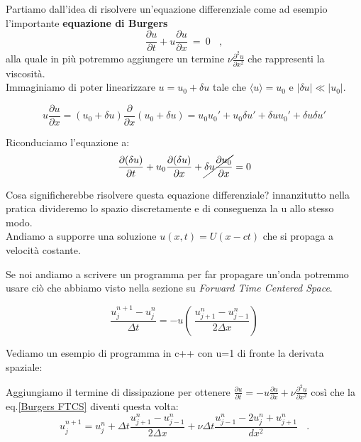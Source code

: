 Partiamo dall'idea di risolvere un'equazione differenziale come ad esempio l'importante \textbf{equazione di Burgers}
\[\frac{\partial u}{\partial t} + u\frac{\partial u}{\partial x}\ =\ 0\ \ \ \ ,\]
alla quale in più potremmo aggiungere un termine $\nu \displaystyle \frac{\partial^2 u}{\partial x^2}$ che rappresenti la viscosità.\\
Immaginiamo di poter linearizzare $u=u_0+\delta u$ tale che $\langle u \rangle=u_0$ e $|\delta u|\ll |u_0|$.

\[u\frac{\partial u}{\partial x} = (u_0+\delta u) \frac{\partial}{\partial x} (u_0+\delta u)=u_0 u_0' + u_0\delta u' + \delta u u_0' + \delta u \delta u'\]

Riconduciamo l'equazione a:
\[ \frac{\partial (\delta u)}{\partial t} + u_0\frac{\partial (\delta u)}{\partial x} + \cancel{\delta u\frac{\partial  u_0}{\partial x}}= 0\]

Cosa significherebbe risolvere questa equazione differenziale? innanzitutto nella pratica divideremo lo spazio discretamente e di conseguenza la u allo stesso modo.\\
Andiamo a supporre una soluzione $u(x, t) = U(x-ct)$ che si propaga a velocità costante.

Se noi andiamo a scrivere un programma per far propagare un'onda potremmo usare ciò che abbiamo visto nella sezione su \emph{Forward Time Centered Space}.

\[\frac{u_j^{n+1} - u_j^{n}}{\Delta t} = -u\left(\ \frac{u_{j+1}^{n} - u_{j-1}^{n}}{2\Delta x}\right)\]

Vediamo un esempio di programma in c++ con u=1 di fronte la derivata spaziale:



Aggiungiamo il termine di dissipazione per ottenere $\boxed{\frac{\partial u}{\partial t} = - u \frac{\partial u}{\partial x} + \nu \frac{\partial^2 u}{\partial x^2}}$ così che la eq.\ref{Burgers FTCS} diventi questa volta:
\[
u^{n+1}_j = u^n_j + \Delta t \frac{u_{j+1}^{n} - u_{j-1}^{n}}{2\Delta x} + \nu \Delta t \frac{u_{j-1}^n -2u_j^n + u_{j+1}^n}{dx^2}  \ \ \ \ .
\]

